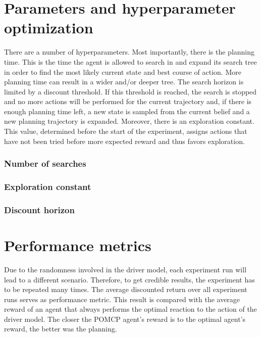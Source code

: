 \section{Parameters and hyperparameter optimization}


There are a number of hyperparameters. Most importantly, there is the planning time. This is the time the agent is allowed to search in and expand its search tree in order to find the most likely current state and best course of action. More planning time can result in a wider and/or deeper tree. The search horizon is limited by a discount threshold. If this threshold is reached, the search is stopped and no more actions will be performed for the current trajectory and, if there is enough planning time left, a new state is sampled from the current belief and a new planning trajectory is expanded. Moreover, there is an exploration constant. This value, determined before the start of the experiment, assigns actions that have not been tried before more expected reward and thus favors exploration.
\subsubsection{Number of searches}
\subsubsection{Exploration constant}
\subsubsection{Discount horizon}

\section{Performance metrics}
Due to the randomness involved in the driver model, each experiment run will lead to a different scenario. Therefore, to get credible results, the experiment has to be repeated many times. The average discounted return over all experiment runs serves as performance metric. This result is compared with the average reward of an agent that always performs the optimal reaction to the action of the driver model. The closer the POMCP agent's reward is to the optimal agent's reward, the better was the planning.

